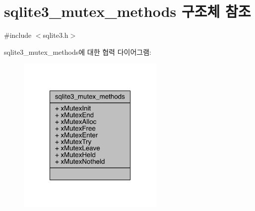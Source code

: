 \hypertarget{structsqlite3__mutex__methods}{}\section{sqlite3\+\_\+mutex\+\_\+methods 구조체 참조}
\label{structsqlite3__mutex__methods}


{\ttfamily \#include $<$sqlite3.\+h$>$}



sqlite3\+\_\+mutex\+\_\+methods에 대한 협력 다이어그램\+:
\nopagebreak
\begin{figure}[H]
\begin{center}
\leavevmode
\includegraphics[width=200pt]{d3/dd0/structsqlite3__mutex__methods__coll__graph}
\end{center}
\end{figure}
